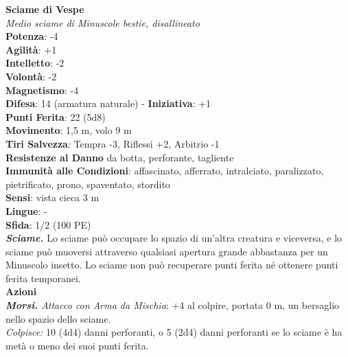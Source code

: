 \begin{multicols}{2}
\medskip\textbf{Sciame di Vespe}\\
\emph{Medio sciame di Minuscole bestie, disallineato}\\
\textbf{Potenza}: -4\\
\textbf{Agilità}: +1\\
\textbf{Intelletto}: -2\\
\textbf{Volontà}: -2\\
\textbf{Magnetismo}: -4\\
\textbf{Difesa}: 14 (armatura naturale) - \textbf{Iniziativa}: +1\\
\textbf{Punti Ferita}: 22 (5d8)\\
\textbf{Movimento}: 1,5 m, volo 9 m\\
\textbf{Tiri Salvezza}: Tempra -3, Riflessi +2, Arbitrio -1\\
\textbf{Resistenze al Danno} da botta, perforante, tagliente\\
\textbf{Immunità alle Condizioni}: affascinato, afferrato, intralciato, paralizzato, pietrificato, prono, spaventato, stordito\\
\textbf{Sensi}: vista cieca 3 m\\
\textbf{Lingue}: -\\
\textbf{Sfida}: 1/2 (100 PE)\smallskip\\
\emph{\textbf{Sciame.}} Lo sciame può occupare lo spazio di un'altra creatura e viceversa, e lo sciame può muoversi attraverso qualsiasi apertura grande abbastanza per un Minuscolo insetto. Lo sciame non può recuperare punti ferita né ottenere punti ferita temporanei.\\
\smallskip\textbf{Azioni}\\
\emph{\textbf{Morsi.} Attacco con Arma da Mischia}: +4 al colpire, portata 0 m, un bersaglio nello spazio dello sciame.\\
\emph{Colpisce:} 10 (4d4) danni perforanti, o 5 (2d4) danni perforanti se lo sciame è ha metà o meno dei suoi punti ferita.\\


\end{multicols}
